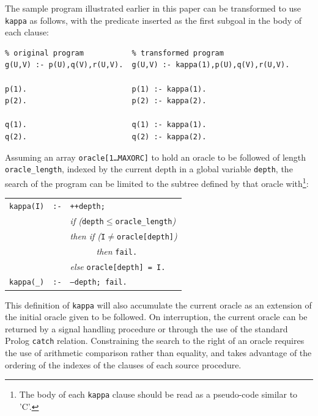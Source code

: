 \documentclass[a4paper,11pt,twoside]{article}
\begin{document}
The sample program illustrated earlier in this paper can be transformed to use
\texttt{kappa} as follows, with the predicate inserted as the first subgoal in
the body of each clause:
\begin{verbatim}
% original program           % transformed program
g(U,V) :- p(U),q(V),r(U,V).  g(U,V) :- kappa(1),p(U),q(V),r(U,V).

p(1).                        p(1) :- kappa(1).
p(2).                        p(2) :- kappa(2).

q(1).                        q(1) :- kappa(1).
q(2).                        q(2) :- kappa(2).
\end{verbatim}
Assuming an array \texttt{oracle[1\ldots MAXORC]} to hold an oracle to be followed
of length \texttt{oracle\_{}length},
indexed by the current depth in a global variable \texttt{depth}, the search of the
program can be limited to the subtree defined by that oracle
with\footnote{The body of each \texttt{kappa} clause should be read as a
pseudo-code similar to 'C'.}:\\
\begin{tabular}{l l l}
\texttt{kappa(I)} & \texttt{:-} & \texttt{++depth;} \\
 & & \textit{if (}\texttt{depth}$\le$\texttt{oracle\_{}length}\textit{)}\\
 & & \textit{then if (}\texttt{I}$\ne$\texttt{oracle[depth]}\textit{)}\\
 & & \textit{~~~~~~then} \texttt{fail.}\\
 & & \textit{else} \texttt{oracle[depth] = I.}\\
\texttt{kappa(\_{})} & \texttt{:-} & \texttt{--depth; fail.} \\
\end{tabular}

This definition of \texttt{kappa} will also accumulate the current
oracle as an extension of the initial oracle given to be followed.  On
interruption, the current oracle can be returned by a signal handling
procedure or through the use of the standard Prolog \texttt{catch}
relation.  Constraining the search to the right of an oracle requires
the use of arithmetic comparison rather than equality, and takes
advantage of the ordering of the indexes of the clauses of each source
procedure.
\end{document}
